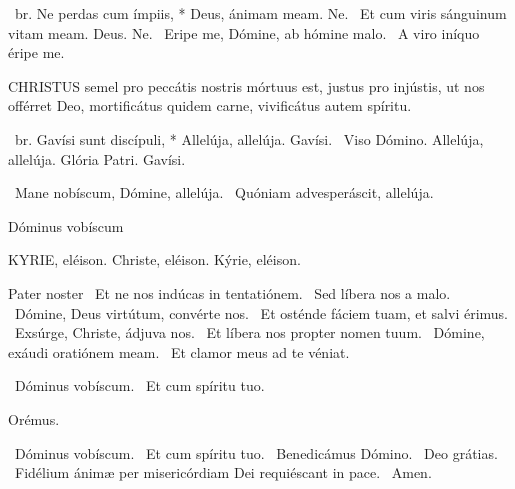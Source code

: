 \R\ br. Ne perdas cum ímpiis, * Deus, ánimam meam. Ne. \V\ Et cum viris sánguinum vitam meam. Deus. Ne. \V\ Eripe me, Dómine, ab hómine malo. \R\ A viro iníquo éripe me.





\lettrine[lines=2]{C}{HRISTUS} semel pro peccátis nostris mórtuus est, justus pro injústis, ut nos offérret Deo, mortificátus quidem carne, vivificátus autem spíritu.


\R\ br. Gavísi sunt discípuli, * Allelúja, allelúja. Gavísi. \V\ Viso Dómino. Allelúja, allelúja. Glória Patri. Gavísi.

\V\ Mane nobíscum, Dómine, allelúja. \R\ Quóniam advesperáscit, allelúja.

 Dóminus vobíscum 


KYRIE, eléison. Christe, eléison. Kýrie, eléison.

Pater noster  \V\ Et ne nos indúcas in tentatiónem. \R\ Sed líbera nos a malo. \V\ Dómine, Deus virtútum, convérte nos. \R\ Et osténde fáciem tuam, et salvi érimus. \V\ Exsúrge, Christe, ádjuva nos. \R\ Et líbera nos propter nomen tuum. \V\ Dómine, exáudi oratiónem meam. \R\ Et clamor meus ad te véniat.


\V\ Dóminus vobíscum. \R\ Et cum spíritu tuo.

Orémus.



\V\ Dóminus vobíscum. \R\ Et cum spíritu tuo. \V\ Benedicámus Dómino. \R\ Deo grátias. \V\ Fidélium ánimæ per misericórdiam Dei requiéscant in pace. \R\ Amen.

